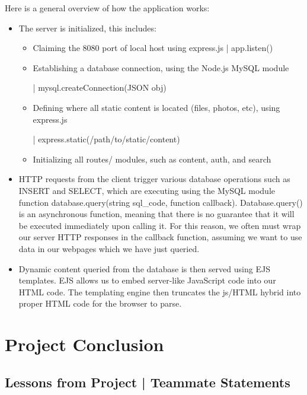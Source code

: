 \documentclass[letter, 12pt, titlepage]{article}
\begin{document}
	Here is a general overview of how the application works:
	\begin{itemize}
		\item The server is initialized, this includes:
			\begin{itemize}
				\item Claiming the 8080 port of local host using express.js | app.listen()
				\item Establishing a database connection, using the Node.js MySQL module 
					
					| mysql.createConnection(JSON obj)
				\item Defining where all static content is located  (files, photos, etc), using express.js
					
					| express.static(/path/to/static/content)
				\item Initializing all routes/ modules, such as content, auth, and search
			\end{itemize}
		\item HTTP requests from the client trigger various database operations such as INSERT and SELECT, which are executing using the MySQL module function database.query(string sql\_code, function callback). Database.query() is an asynchronous function, meaning that there is no guarantee that it will be executed immediately upon calling it. For this reason, we often must wrap our server HTTP responses in the callback function, assuming we want to use data in our webpages which we have just queried.
		\item Dynamic content queried from the database is then served using EJS templates.
			EJS allows us to embed server-like JavaScript code into our HTML code. 
			The templating engine then truncates the js/HTML hybrid into proper HTML code for the browser to parse.
	\end{itemize}

\section{Project Conclusion}

\subsection{Lessons from Project | Teammate Statements}
\end{document}

